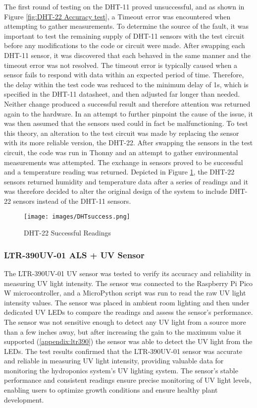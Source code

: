 \documentclass[12pt]{article} %
\begin{document}
\noindent The first round of testing on the DHT-11 proved unsuccessful, and as shown in Figure \ref{fig:DHT-22 Accuracy test}, a Timeout error was encountered when attempting to gather measurements. To determine the source of the fault, it was important to test the remaining supply of DHT-11 sensors with the test circuit before any modifications to the code or circuit were made. After swapping each DHT-11 sensor, it was discovered that each behaved in the same manner and the timeout error was not resolved. The timeout error is typically caused when a sensor fails to respond with data within an expected period of time. Therefore, the delay within the test code was reduced to the minimum delay of 1s, which is specified in the DHT-11 datasheet, and then adjusted far longer than needed. Neither change produced a successful result and therefore attention was returned again to the hardware. 
\newline
\newline
\noindent In an attempt to further pinpoint the cause of the issue, it was then assumed that the sensors used could in fact be malfunctioning. To test this theory, an alteration to the test circuit was made by replacing the sensor with its more reliable version, the DHT-22. After swapping the sensors in the test circuit, the code was run in Thonny and an attempt to gather environmental measurements was attempted. The exchange in sensors proved to be successful and a temperature reading was returned. Depicted in Figure \ref{fig:DHT-22 Succesful test}, the DHT-22 sensors returned humidity and temperature data after a series of readings and it was therefore decided to alter the original design of the system to include DHT-22 sensors instead of the DHT-11 sensors. 

\begin{figure}[H]
  \centering
  \texttt{[image: images/DHTsuccess.png]}
  \caption{DHT-22 Successful Readings}
  \label{fig:DHT-22 Succesful test}
\end{figure}
\subsubsection{LTR-390UV-01 ALS + UV Sensor}
\noindent The LTR-390UV-01 UV \cite{ref_ltr390} sensor was tested to verify its accuracy and reliability in measuring UV light intensity. The sensor was connected to the Raspberry Pi Pico W microcontroller, and a MicroPython script \cite{ref_uvforum} was run to read the raw UV light intensity values. The sensor was placed in ambient room lighting and then under dedicated UV LEDs to compare the readings and assess the sensor's performance. The sensor was not sensitive enough to detect any UV light from a source more than a few inches away, but after increasing the gain to the maximum value it supported (\ref{appendix:ltr390}) the sensor was able to detect the UV light from the LEDs. The test results confirmed that the LTR-390UV-01 sensor was accurate and reliable in measuring UV light intensity, providing valuable data for monitoring the hydroponics system's UV lighting system. The sensor's stable performance and consistent readings ensure precise monitoring of UV light levels, enabling users to optimize growth conditions and ensure healthy plant development.
\end{document}
